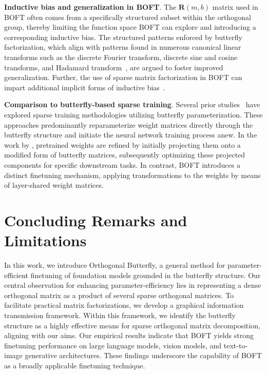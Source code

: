 \textbf{Inductive bias and generalization in BOFT}. The $\bm{R}(m,b)$ matrix used in BOFT often comes from a specifically structured subset within the orthogonal group, thereby limiting the function space BOFT can explore and introducing a corresponding inductive bias. The structured patterns enforced by butterfly factorization, which align with patterns found in numerous canonical linear transforms such as the discrete Fourier transform, discrete sine and cosine transforms, and Hadamard transform~\cite{dao2019kaleidoscope}, are argued to foster improved generalization. Further, the use of sparse matrix factorization in BOFT can impart additional implicit forms of inductive bias~\cite{gunasekar2017implicit,li2018algorithmic,liu2019neural}.

\textbf{Comparison to butterfly-based sparse training}. Several prior studies~\cite{dao2019learning,dao2019kaleidoscope,chen2022pixelated,dao2022monarch} have explored sparse training methodologies utilizing butterfly parameterization. These approaches predominantly reparameterize weight matrices directly through the butterfly structure and initiate the neural network training process anew. In the work by \cite{dao2022monarch}, pretrained weights are refined by initially projecting them onto a modified form of butterfly matrices, subsequently optimizing these projected components for specific downstream tasks. In contrast, BOFT introduces a distinct finetuning mechanism, applying transformations to the weights by means of layer-shared weight matrices.



\section{Concluding Remarks and Limitations}

In this work, we introduce Orthogonal Butterfly, a general method for parameter-efficient finetuning of foundation models grounded in the butterfly structure. Our central observation for enhancing parameter-efficiency lies in representing a dense orthogonal matrix as a product of several sparse orthogonal matrices. To facilitate practical matrix factorizations, we develop a graphical information transmission framework. Within this framework, we identify the butterfly structure as a highly effective means for sparse orthogonal matrix decomposition, aligning with our aims. Our empirical results indicate that BOFT yields strong finetuning performance on large language models, vision models, and text-to-image generative architectures. These findings underscore the capability of BOFT as a broadly applicable finetuning technique.

